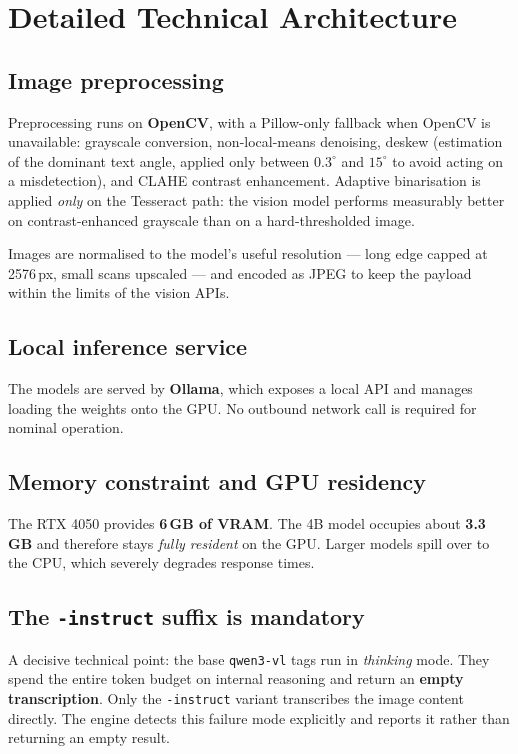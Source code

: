 \documentclass[11pt,a4paper]{article}
\begin{document}
\section{Detailed Technical Architecture}

\subsection{Image preprocessing}

Preprocessing runs on \textbf{OpenCV}, with a Pillow-only fallback when OpenCV
is unavailable: grayscale conversion, non-local-means denoising, deskew
(estimation of the dominant text angle, applied only between $0.3^\circ$ and
$15^\circ$ to avoid acting on a misdetection), and CLAHE contrast enhancement.
Adaptive binarisation is applied \emph{only} on the Tesseract path: the vision
model performs measurably better on contrast-enhanced grayscale than on a
hard-thresholded image.

Images are normalised to the model's useful resolution --- long edge capped at
2576\,px, small scans upscaled --- and encoded as JPEG to keep the payload
within the limits of the vision APIs.

\subsection{Local inference service}

The models are served by \textbf{Ollama}, which exposes a local API and manages
loading the weights onto the GPU. No outbound network call is required for
nominal operation.

\subsection{Memory constraint and GPU residency}

The RTX 4050 provides \textbf{6\,GB of VRAM}. The 4B model occupies about
\textbf{3.3\,GB} and therefore stays \emph{fully resident} on the GPU. Larger
models spill over to the CPU, which severely degrades response times.

\subsection{The \texttt{-instruct} suffix is mandatory}

A decisive technical point: the base \texttt{qwen3-vl} tags run in
\emph{thinking} mode. They spend the entire token budget on internal reasoning
and return an \textbf{empty transcription}. Only the \texttt{-instruct} variant
transcribes the image content directly. The engine detects this failure mode
explicitly and reports it rather than returning an empty result.
\end{document}
